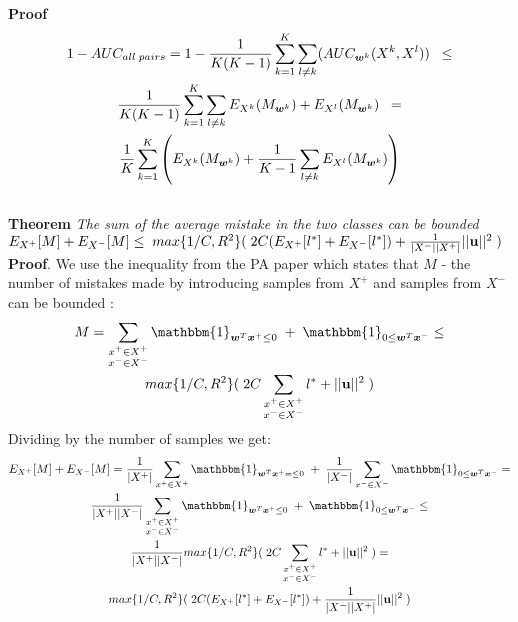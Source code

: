 {\bf Proof} 
\begin{multline}
1 - AUC_{all \; pairs}  = 1 - \frac{1}{K(K-1)} \sum\limits_{k=1}^{K}  \sum\limits_{l \neq k} (AUC_{\bm{w}^k}(X^k, X^l)) \;\;\leq \\
\frac{1}{K(K-1)} \sum\limits_{k=1}^{K}  \sum\limits_{l \neq k} E_{X^k}(M_{\bm{w}^k}) + E_{X^l}(M_{\bm{w}^k}) \;\; = \\
\frac{1}{K} \sum\limits_{k=1}^{K}  \left( E_{X^k}(M_{\bm{w}^k}) +  \frac{1}{K-1} \sum\limits_{l \neq k} E_{X^l}(M_{\bm{w}^k}  ) \right)
\end{multline}
\hfill\BlackBox
\\

{\bf Theorem} {\it The sum of the average mistake in the two classes can be bounded \\
$E_{X^+}[M] + E_{X^-}[M] \leq \; max\{1/C, R^2\}( \; 2C (E_{X^+}[l^{*}] + E_{X^-}[l^{*}]) +
\frac{1}{|X^-| |X^+|}  ||{\bf u}||^2  \;) $
} 
\\


{\bf Proof}.
We use the inequality from the PA paper which states that $M$ - the number of mistakes made by introducing samples from $X^+$ and samples from $X^-$ can be bounded : \\
\begin{multline}
 M= \sum\limits_{ \substack{x^+ \in X^+ \\ x^- \in X^-}} {  \mathbbm{1}_{\vw^T \vxp \leq 0} \;+\; \mathbbm{1}_{0 \leq \vw^T \vxn}  } \leq \\
 max\{1/C, R^2\}( \; 2C \sum\limits_{ \substack{x^+ \in X^+ \\ x^- \in X^-}}l^{*} +
 ||{\bf u}||^2  \;) 
\end{multline}
Dividing by the number of samples we get:
\begin{multline}
 E_{X^+}[M] + E_{X^-}[M] = 
 \frac{1}{|X^+|} \sum\limits_{ x^+ \in X^+ }   \mathbbm{1}_{\vw^T \vxp = \leq 0} \;+\; 
 \frac{1}{|X^-|} \sum\limits_{ x^- \in X^- } \mathbbm{1}_{0 \leq \vw^T \vxn} = \\
 \frac{1}{|X^+| |X^-|} \sum\limits_{ \substack{x^+ \in X^+ \\ x^- \in X^-}} {  \mathbbm{1}_{\vw^T \vxp \leq 0} \;+\; \mathbbm{1}_{0 \leq \vw^T \vxn}  }    \leq \\
 \frac{1}{|X^+| |X^-|} max\{1/C, R^2\}( \; 2C \sum\limits_{ \substack{x^+ \in X^+ \\ x^- \in X^-}}l^{*} +
 ||{\bf u}||^2  \;) = \\
 max\{1/C, R^2\}( \; 2C (E_{X^+}[l^{*}] + E_{X^-}[l^{*}]) +
\frac{1}{|X^-| |X^+|}  ||{\bf u}||^2  \;) 
\end{multline}
\hfill\BlackBox

